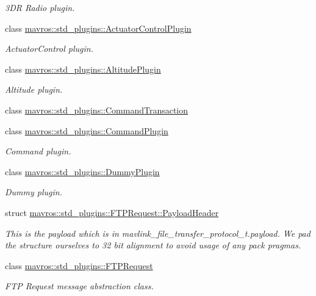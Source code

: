 \begin{DoxyCompactItemize}
\begin{DoxyCompactList}\small\item\em 3DR Radio plugin. \end{DoxyCompactList}\item 
class \mbox{\hyperlink{classmavros_1_1std__plugins_1_1ActuatorControlPlugin}{mavros\+::std\+\_\+plugins\+::\+Actuator\+Control\+Plugin}}
\begin{DoxyCompactList}\small\item\em Actuator\+Control plugin. \end{DoxyCompactList}\item 
class \mbox{\hyperlink{classmavros_1_1std__plugins_1_1AltitudePlugin}{mavros\+::std\+\_\+plugins\+::\+Altitude\+Plugin}}
\begin{DoxyCompactList}\small\item\em Altitude plugin. \end{DoxyCompactList}\item 
class \mbox{\hyperlink{classmavros_1_1std__plugins_1_1CommandTransaction}{mavros\+::std\+\_\+plugins\+::\+Command\+Transaction}}
\item 
class \mbox{\hyperlink{classmavros_1_1std__plugins_1_1CommandPlugin}{mavros\+::std\+\_\+plugins\+::\+Command\+Plugin}}
\begin{DoxyCompactList}\small\item\em Command plugin. \end{DoxyCompactList}\item 
class \mbox{\hyperlink{classmavros_1_1std__plugins_1_1DummyPlugin}{mavros\+::std\+\_\+plugins\+::\+Dummy\+Plugin}}
\begin{DoxyCompactList}\small\item\em Dummy plugin. \end{DoxyCompactList}\item 
struct \mbox{\hyperlink{structmavros_1_1std__plugins_1_1FTPRequest_1_1PayloadHeader}{mavros\+::std\+\_\+plugins\+::\+F\+T\+P\+Request\+::\+Payload\+Header}}
\begin{DoxyCompactList}\small\item\em This is the payload which is in mavlink\+\_\+file\+\_\+transfer\+\_\+protocol\+\_\+t.\+payload. We pad the structure ourselves to 32 bit alignment to avoid usage of any pack pragmas. \end{DoxyCompactList}\item 
class \mbox{\hyperlink{classmavros_1_1std__plugins_1_1FTPRequest}{mavros\+::std\+\_\+plugins\+::\+F\+T\+P\+Request}}
\begin{DoxyCompactList}\small\item\em F\+TP Request message abstraction class. \end{DoxyCompactList}\item 

\end{DoxyCompactItemize}
